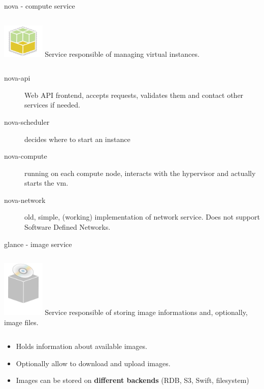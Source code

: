 \documentclass[english,serif,mathserif,usenames,dvipsnames]{beamer}
\begin{document}
\begin{frame}
  {nova - compute service}
  \begin{columns}
    \column{2cm}
    \includegraphics[width=2cm]{openstack-compute-icon.png}
    \column{8cm}
    Service responsible of managing virtual instances.
  \end{columns}
  \begin{description}
  \item[nova-api] Web API frontend, accepts requests, validates them
    and contact other services if needed.
  \item[nova-scheduler] decides where to start an instance
  \item[nova-compute] running on each compute node, interacts with the
    hypervisor and actually starts the vm.
  \item[nova-network] old, simple, (working) implementation of network
    service. Does not support Software Defined Networks.
  \end{description}
\end{frame}

\begin{frame}
  {glance - image service}
  \begin{columns}
    \column{2cm}
    \includegraphics[width=2cm]{glance-icon.png}
    \column{8cm}
    Service responsible of storing image informations and, optionally,
    image files.
  \end{columns}

  \+
  \begin{itemize}
  \item Holds information about available images.
  \item Optionally allow to download and upload images.
  \item Images can be stored on \textbf{different backends} (RDB, S3,
    Swift, filesystem)
  \end{itemize}
\end{frame}
\end{document}
